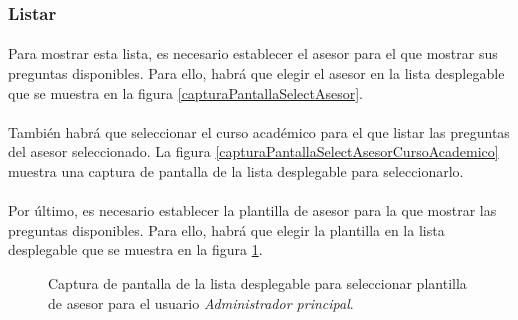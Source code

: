 \subsubsection{Listar}

  \paragraph{}Para mostrar esta lista, es necesario establecer el asesor para
  el que mostrar sus preguntas disponibles. Para ello, habrá que elegir
  el asesor en la lista desplegable que se muestra en la figura
  \ref{capturaPantallaSelectAsesor}.

  \paragraph{}También habrá que seleccionar el curso académico para el que
  listar las preguntas del asesor seleccionado. La figura
  \ref{capturaPantallaSelectAsesorCursoAcademico} muestra una captura de
  pantalla de la lista desplegable para seleccionarlo.

  \paragraph{}Por último, es necesario establecer la plantilla de asesor para la
  que mostrar las preguntas disponibles. Para ello, habrá que elegir la
  plantilla en la lista desplegable que se muestra en la
  figura \ref{capturaPantallaSelectPlantillaAsesor}.

  \begin{figure}[!ht]
    \begin{center}
      \caption{Captura de pantalla de la lista desplegable para seleccionar plantilla de asesor para el usuario \textit{Administrador principal}.}
      \label{capturaPantallaSelectPlantillaAsesor}
    \end{center}
  \end{figure}

